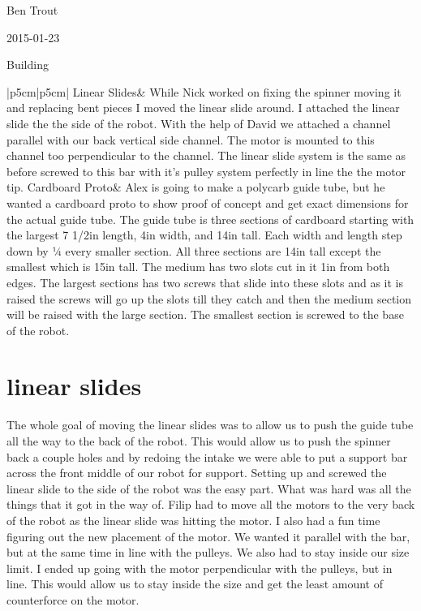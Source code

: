 Ben Trout

2015-01-23

Building

\begin{tabular}{|p{5cm}|p{5cm}|}
\hline
Linear Slides&
While Nick worked on fixing the spinner moving it and replacing bent pieces I moved the linear slide around. I attached the linear slide the the side of the robot. With the help of David we attached a channel parallel with our back vertical side channel. The motor is mounted to this channel too perpendicular to the channel. The linear slide system is the same as before screwed to this bar with it’s pulley system perfectly in line the the motor tip.
\hline
Cardboard Proto&
Alex is going to make a polycarb guide tube, but he wanted a cardboard proto to show proof of concept and get exact dimensions for the actual guide tube. The guide tube is three sections of cardboard starting with the largest 7 1/2in length, 4in width, and 14in tall. Each width and length step down by ¼ every smaller section. All three sections are 14in tall except the smallest which is 15in tall. The medium has two slots cut in it 1in from both edges. The largest sections has two screws that slide into these slots and as it is raised the screws will go up the slots till they catch and then the medium section will be raised with the large section. The smallest section is screwed to the base of the robot. 
\\
\hline
\end{tabular}

\section*{linear slides}
The whole goal of moving the linear slides was to allow us to push the guide tube all the way to the back of the robot. This would allow us to push the spinner back a couple holes and by redoing the intake we were able to put a support bar across the front middle of our robot for support. Setting up and screwed the linear slide to the side of the robot was the easy part. What was hard was all the things that it got in the way of. Filip had to move all the motors to the very back of the robot as the linear slide was hitting the motor. I also had a fun time figuring out the new placement of the motor. We wanted it parallel with the bar, but at the same time in line with the pulleys. We also had to stay inside our size limit. I ended up going with the motor perpendicular with the pulleys, but in line. This would allow us to stay inside the size and get the least amount of counterforce on the motor. 

